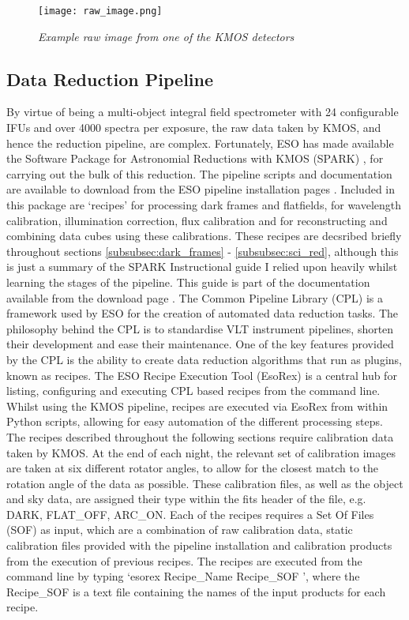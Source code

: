 \documentclass{literature}
\begin{document}
\begin{figure}[!htp]
\centering
\texttt{[image: raw\_image.png]}
\caption{\footnotesize{\emph{Example raw image from one of the KMOS detectors}}}
\label{fig:raw_image}
\end{figure}  	
  
\subsection{Data Reduction Pipeline}\label{sec:reduction}
By virtue of being a multi-object integral field spectrometer with 24 configurable IFUs and over 4000 spectra per exposure, the raw data taken by KMOS, and hence the reduction pipeline, are complex. Fortunately, ESO has made available the Software Package for Astronomial Reductions with KMOS (SPARK) \citep{Davies2013}, for carrying out the bulk of this reduction. The pipeline scripts and documentation are available to download from the ESO pipeline installation pages \citep{ESO2015}. Included in this package are `recipes' for processing dark frames and flatfields, for wavelength calibration, illumination correction, flux calibration and for reconstructing and combining data cubes using these calibrations. These recipes are decsribed briefly throughout sections \ref{subsubsec:dark_frames} - \ref{subsubsec:sci_red}, although this is just a summary of the SPARK Instructional guide I relied upon heavily whilst learning the stages of the pipeline. This guide is part of the documentation available from the download page \citep{ESO2015}. The Common Pipeline Library (CPL) is a framework used by ESO for the creation of automated data reduction tasks. The philosophy behind the CPL is to standardise VLT instrument pipelines, shorten their development and ease their maintenance. One of the key features provided by the CPL is the ability to create data reduction algorithms that run as plugins, known as recipes. The ESO Recipe Execution Tool (EsoRex) is a central hub for listing, configuring and executing CPL based recipes from the command line. Whilst using the KMOS pipeline, recipes are executed via EsoRex from within Python scripts, allowing for easy automation of the different processing steps. The recipes described throughout the following sections require calibration data taken by KMOS. At the end of each night, the relevant set of calibration images are taken at six different rotator angles, to allow for the closest match to the rotation angle of the data as possible. These calibration files, as well as the object and sky data, are assigned their type within the fits header of the file, e.g. DARK, FLAT\_OFF, ARC\_ON. Each of the recipes requires a Set Of Files (SOF) as input, which are a combination of raw calibration data, static calibration files provided with the pipeline installation and calibration products from the execution of previous recipes. The recipes are executed from the command line by typing `esorex \* Recipe\_Name \* \* Recipe\_SOF \*', where the Recipe\_SOF is a text file containing the names of the input products for each recipe.   \\ 
\end{document}
